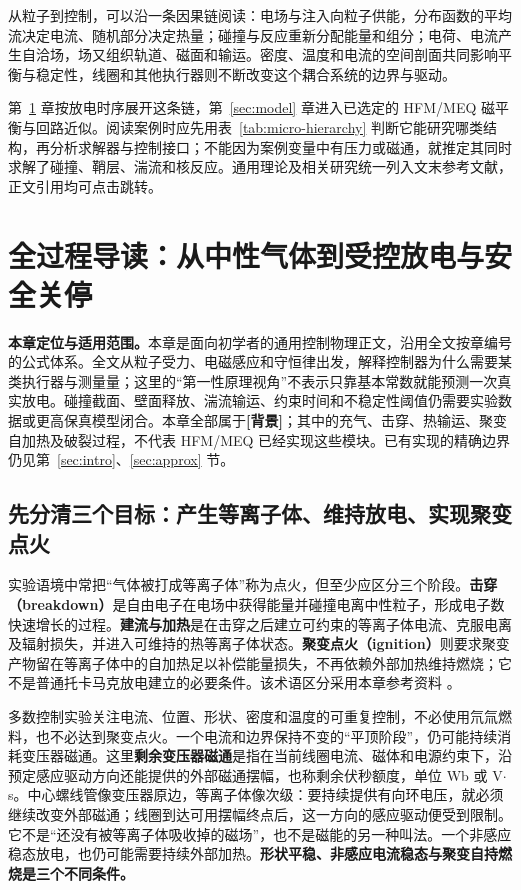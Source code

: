 \documentclass[12pt,fontset=none]{ctexart}
\numberwithin{equation}{section}
\numberwithin{table}{section}
\numberwithin{figure}{section}
\newcommand{\evbg}{\textbf{[背景]}}
\begin{document}
从粒子到控制，可以沿一条因果链阅读：电场与注入向粒子供能，分布函数的平均流决定电流、随机部分决定热量；碰撞与反应重新分配能量和组分；电荷、电流产生自洽场，场又组织轨道、磁面和输运。密度、温度和电流的空间剖面共同影响平衡与稳定性，线圈和其他执行器则不断改变这个耦合系统的边界与驱动。

第~\ref{sec:lifecycle} 章按放电时序展开这条链，第~\ref{sec:model} 章进入已选定的 HFM/MEQ 磁平衡与回路近似。阅读案例时应先用表~\ref{tab:micro-hierarchy} 判断它能研究哪类结构，再分析求解器与控制接口；不能因为案例变量中有压力或磁通，就推定其同时求解了碰撞、鞘层、湍流和核反应。通用理论及相关研究统一列入文末参考文献，正文引用均可点击跳转。

\clearpage
\section{全过程导读：从中性气体到受控放电与安全关停}
\label{sec:lifecycle}

\textbf{本章定位与适用范围。}本章是面向初学者的通用控制物理正文，沿用全文按章编号的公式体系。全文从粒子受力、电磁感应和守恒律出发，解释控制器为什么需要某类执行器与测量量；这里的``第一性原理视角''不表示只靠基本常数就能预测一次真实放电。碰撞截面、壁面释放、湍流输运、约束时间和不稳定性阈值仍需要实验数据或更高保真模型闭合。本章全部属于\evbg{}；其中的充气、击穿、热输运、聚变自加热及破裂过程，不代表 HFM/MEQ 已经实现这些模块。已有实现的精确边界仍见第~\ref{sec:intro}、\ref{sec:approx} 节。

\subsection{先分清三个目标：产生等离子体、维持放电、实现聚变点火}\label{sec:cycle-goals}

实验语境中常把``气体被打成等离子体''称为点火，但至少应区分三个阶段。\textbf{击穿（breakdown）}是自由电子在电场中获得能量并碰撞电离中性粒子，形成电子数快速增长的过程。\textbf{建流与加热}是在击穿之后建立可约束的等离子体电流、克服电离及辐射损失，并进入可维持的热等离子体状态。\textbf{聚变点火（ignition）}则要求聚变产物留在等离子体中的自加热足以补偿能量损失，不再依赖外部加热维持燃烧；它不是普通托卡马克放电建立的必要条件。该术语区分采用本章参考资料 \cite{C1}。

多数控制实验关注电流、位置、形状、密度和温度的可重复控制，不必使用氘氚燃料，也不必达到聚变点火。一个电流和边界保持不变的``平顶阶段''，仍可能持续消耗变压器磁通。这里\textbf{剩余变压器磁通}是指在当前线圈电流、磁体和电源约束下，沿预定感应驱动方向还能提供的外部磁通摆幅，也称剩余伏秒额度，单位 Wb 或 V$\cdot$s。中心螺线管像变压器原边，等离子体像次级：要持续提供有向环电压，就必须继续改变外部磁通；线圈到达可用摆幅终点后，这一方向的感应驱动便受到限制。它不是``还没有被等离子体吸收掉的磁场''，也不是磁能的另一种叫法。一个非感应稳态放电，也仍可能需要持续外部加热。\textbf{形状平稳、非感应电流稳态与聚变自持燃烧是三个不同条件。}
\end{document}

